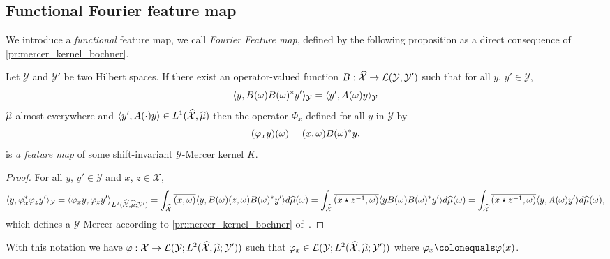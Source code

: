 \subsection{Functional Fourier feature map}
We introduce a \emph{functional} feature map, we call \emph{Fourier 
Feature map}, defined by the following proposition as a direct consequence of
\cref{pr:mercer_kernel_bochner}.
\begin{proposition}
    \label{pr:fourier_feature_map} Let $\mathcal{Y}$ and $\mathcal{Y}'$ be two
    Hilbert spaces. If there exist an operator-valued function
    $B:\widehat{\mathcal{X}}\to\mathcal{L}(\mathcal{Y},\mathcal{Y}')$ such that
    for all $y$, $y'\in\mathcal{Y}$,
    \begin{dmath*}
        \inner{y, B(\omega)B(\omega)^\adjoint y'}_{\mathcal{Y}}
        =\inner{y', A(\omega)y}_{\mathcal{Y}}
    \end{dmath*}
    $\widehat{\mu}$-almost everywhere and $\langle y', A(\cdot)y\rangle\in
    L^1(\widehat{\mathcal{X}},\widehat{\mu})$ then the operator $\Phi_x$ defined for
    all $y$ in $\mathcal{Y}$ by
    \begin{dmath}
        \label{eq:feature_shiftinv_map}
        (\Phi_x y)(\omega)=\pairing{x,\omega}B(\omega)^\adjoint y,
    \end{dmath}
    is \emph{a feature map} of some shift-invariant
    $\mathcal{Y}$-Mercer kernel $K$.
\end{proposition}
\begin{proof}
    For all $y$, $y'\in \mathcal{Y}$ and $x$, $z\in\mathcal{X}$,
    \begin{dmath*}
        \inner{y, \Phi_x^\adjoint \Phi_z y'}_{\mathcal{Y}} = \inner{\Phi_x y,
        \Phi_z y'}_{L^2(\dual{\mathcal{X}},\dual{\mu};\mathcal{Y}')} \\ =
        \int_{\dual{\mathcal{X}}}\conj{\pairing{x,\omega}}\inner{y,
        B(\omega)\pairing{z,\omega}B(\omega)^\adjoint y'}d\dual{\mu}(\omega) \\
        = \int_{\dual{\mathcal{X}}}\conj{\pairing{x \groupop
        \myinv{z},\omega}}\inner{y B(\omega)B(\omega)^\adjoint
        y'}d\dual{\mu}(\omega) \\ = \int_{\dual{\mathcal{X}}}\conj{\pairing{x
        \groupop \inv{z},\omega}}\inner{y,A(\omega)y'}d\dual{\mu}(\omega),
    \end{dmath*}
    which defines a $\mathcal{Y}$-Mercer according to
    \cref{pr:mercer_kernel_bochner} of~\citet{Carmeli2010}.
\end{proof}
With this notation we have $\Phi: \mathcal{X} \to \mathcal{L}(\mathcal{Y};
L^2(\dual{\mathcal{X}}, \dual{\mu}; \mathcal{Y}'))$ such that $\Phi_x\in
\mathcal{L}(\mathcal{Y}; L^2(\dual{\mathcal{X}}, \dual{\mu}; \mathcal{Y}'))$
where $\Phi_x\colonequals\Phi(x)$.

